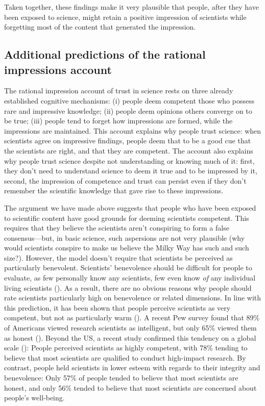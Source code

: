 \documentclass[
  jou,
  floatsintext,
  longtable,
  nolmodern,
  notxfonts,
  notimes,
  colorlinks=true,linkcolor=blue,citecolor=blue,urlcolor=blue]{apa7}
\begin{document}
Taken together, these findings make it very plausible that people, after
they have been exposed to science, might retain a positive impression of
scientists while forgetting most of the content that generated the
impression.

\subsection{Additional predictions of the rational impressions
account}\label{additional-predictions-of-the-rational-impressions-account}

The rational impression account of trust in science rests on three
already established cognitive mechanisms: (i) people deem competent
those who possess rare and impressive knowledge; (ii) people deem
opinions others converge on to be true; (iii) people tend to forget how
impressions are formed, while the impressions are maintained. This
account explains why people trust science: when scientists agree on
impressive findings, people deem that to be a good cue that the
scientists are right, and that they are competent. The account also
explains why people trust science despite not understanding or knowing
much of it: first, they don't need to understand science to deem it true
and to be impressed by it, second, the impression of competence and
trust can persist even if they don't remember the scientific knowledge
that gave rise to these impressions.

The argument we have made above suggests that people who have been
exposed to scientific content have good grounds for deeming scientists
competent. This requires that they believe the scientists aren't
conspiring to form a false consensus---but, in basic science, such
aspersions are not very plausible (why would scientists conspire to make
us believe the Milky Way has such and such size?). However, the model
doesn't require that scientists be perceived as particularly benevolent.
Scientists' benevolence should be difficult for people to evaluate, as
few personally know any scientists, few even know \emph{of} any
individual living scientists
(). As a result, there are no obvious reasons why people should rate
scientists particularly high on benevolence or related dimensions. In
line with this prediction, it has been shown that people perceive
scientists as very competent, but not as particularly warm
(). A
recent Pew survey found that 89\% of Americans viewed research
scientists as intelligent, but only 65\% viewed them as honest
(). Beyond the US, a recent study confirmed this tendency on a
global scale (): People perceived scientists as highly competent, with 78\%
tending to believe that most scientists are qualified to conduct
high-impact research. By contrast, people held scientists in lower
esteem with regards to their integrity and benevolence: Only 57\% of
people tended to believe that most scientists are honest, and only 56\%
tended to believe that most scientists are concerned about people's
well-being.
\end{document}
